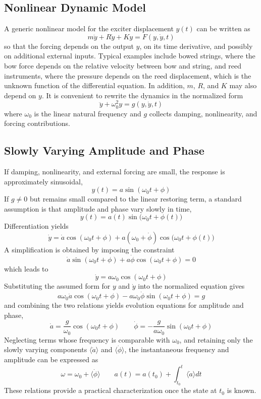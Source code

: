 \subsection{Nonlinear Dynamic Model}

A generic nonlinear model for the exciter displacement \( y(t) \) can be written as
\[
m\ddot y + R\dot y + Ky = F(y,\dot y,t)
\]
so that the forcing depends on the output \( y \), on its time derivative, and possibly on additional external inputs. Typical examples include bowed strings, where the bow force depends on the relative velocity between bow and string, and reed instruments, where the pressure depends on the reed displacement, which is the unknown function of the differential equation. In addition, \( m \), \( R \), and \( K \) may also depend on \( y \). It is convenient to rewrite the dynamics in the normalized form
\[
\ddot y + \omega_0^2 y = g(y,\dot y,t)
\]
where \( \omega_0 \) is the linear natural frequency and \( g \) collects damping, nonlinearity, and forcing contributions.

\subsection{Slowly Varying Amplitude and Phase}

If damping, nonlinearity, and external forcing are small, the response is approximately sinusoidal,
\[
y(t) = a\sin(\omega_0 t + \phi)
\]
If \( g \neq 0 \) but remains small compared to the linear restoring term, a standard assumption is that amplitude and phase vary slowly in time,
\[
y(t) = a(t)\sin\!\bigl(\omega_0 t + \phi(t)\bigr)
\]
Differentiation yields
\[
\dot y
= \dot a \cos(\omega_0 t + \phi)
+ a(\omega_0 + \dot \phi)\cos\!\bigl(\omega_0 t + \phi(t)\bigr)
\]
A simplification is obtained by imposing the constraint
\[
\dot a \sin(\omega_0 t + \phi) + a\dot \phi \cos(\omega_0 t + \phi) = 0
\]
which leads to
\[
\dot y = a\omega_0 \cos(\omega_0 t + \phi)
\]
Substituting the assumed form for \( y \) and \( \dot y \) into the normalized equation gives
\[
a\omega_0 \dot a \cos(\omega_0 t + \phi) - a\omega_0 \dot \phi \sin(\omega_0 t + \phi) = g
\]
and combining the two relations yields evolution equations for amplitude and phase,
\[
\dot a = \frac{g}{\omega_0}\cos(\omega_0 t + \phi)
\qquad
\dot \phi = -\frac{g}{a\omega_0}\sin(\omega_0 t + \phi)
\]
Neglecting terms whose frequency is comparable with \( \omega_0 \), and retaining only the slowly varying components \( \langle \dot a \rangle \) and \( \langle \dot \phi \rangle \), the instantaneous frequency and amplitude can be expressed as
\[
\omega = \omega_0 + \langle \dot \phi \rangle
\qquad
a(t) = a(t_0) + \int_{t_0}^{t} \langle \dot a \rangle dt
\]
These relations provide a practical characterization once the state at \( t_0 \) is known.

